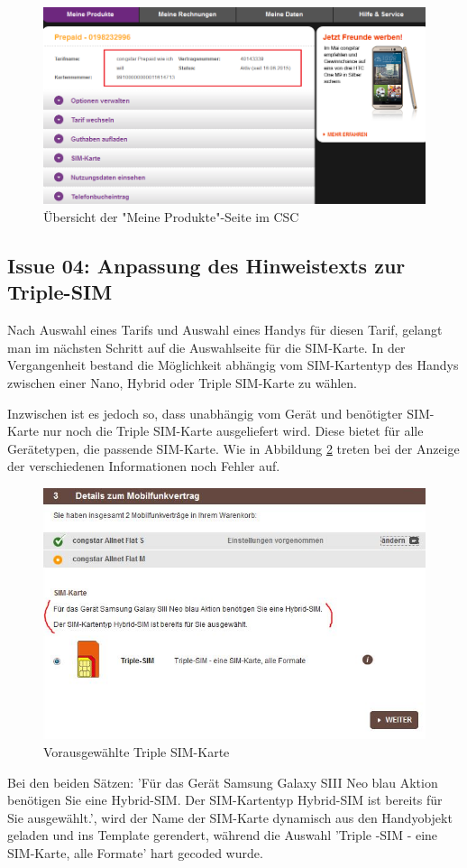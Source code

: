 \documentclass[11pt,a4paper]{article}
\begin{document}
\begin{figure}[h] 
\includegraphics[width=\textwidth]{images/csc.PNG}
\caption{Übersicht der "Meine Produkte"-Seite im CSC \cite{congstarcsc}}
\centering
\label{fig:xxx}
\end{figure}


\subsection{Issue 04: Anpassung des Hinweistexts zur Triple-SIM} 

Nach Auswahl eines Tarifs und Auswahl eines Handys für diesen Tarif, gelangt man im nächsten Schritt 
auf die Auswahlseite für die SIM-Karte. In der Vergangenheit bestand die Möglichkeit abhängig vom
SIM-Kartentyp des Handys zwischen einer Nano, Hybrid oder Triple SIM-Karte zu wählen.

Inzwischen ist es jedoch so, dass unabhängig vom Gerät und benötigter SIM-Karte nur noch die Triple SIM-Karte
ausgeliefert wird. Diese bietet für alle Gerätetypen, die passende SIM-Karte. 
Wie in Abbildung \ref{fig:triple} treten bei der Anzeige der verschiedenen Informationen noch Fehler auf.
\begin{figure}[h] 
\includegraphics[width=\textwidth]{images/triple.PNG}
\caption{Vorausgewählte Triple SIM-Karte \cite{congstar}}
\label{fig:triple}
\centering
\end{figure}
Bei den beiden Sätzen: 'Für das Gerät Samsung Galaxy SIII Neo blau Aktion benötigen Sie eine Hybrid-SIM. Der SIM-Kartentyp Hybrid-SIM ist bereits für Sie ausgewählt.', wird der Name der SIM-Karte dynamisch aus den Handyobjekt geladen und ins Template gerendert, während die Auswahl 'Triple -SIM - eine SIM-Karte, alle Formate' hart gecoded wurde. 
\end{document}
